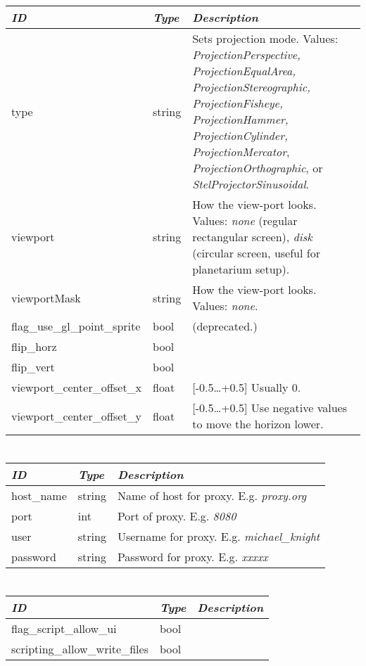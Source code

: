 \begin{longtabu} to \textwidth {l|l|X}
\toprule
\emph{ID} & \emph{Type} & \emph{Description}\tabularnewline
\midrule
type & string & Sets projection mode. Values: \emph{ProjectionPerspective,
ProjectionEqualArea, ProjectionStereographic, ProjectionFisheye,
ProjectionHammer, ProjectionCylinder, ProjectionMercator},
\emph{ProjectionOrthographic}, or \emph{StelProjectorSinusoidal}.\tabularnewline
\midrule
viewport & string & How the view-port looks. Values:
\emph{none} (regular rectangular screen), \emph{disk} (circular screen, useful for planetarium setup).\tabularnewline
\midrule
viewportMask & string & How the view-port looks. Values: \emph{none}.\tabularnewline
\midrule
flag\_use\_gl\_point\_sprite & bool & (deprecated.)\  \tabularnewline
\midrule
flip\_horz & bool & \tabularnewline
\midrule
flip\_vert & bool & \tabularnewline
\midrule
viewport\_center\_offset\_x & float & [-0.5\ldots+0.5] Usually 0. \\
\midrule
viewport\_center\_offset\_y & float & [-0.5\ldots+0.5] Use negative values to move the horizon lower. \\
\bottomrule
\end{longtabu}

\section{}\label{section-proxy}

\begin{longtabu} to \textwidth {l|l|X}
\toprule
\emph{ID} & \emph{Type} & \emph{Description}\tabularnewline
\midrule
host\_name & string & Name of host for proxy. E.g. \emph{proxy.org}\tabularnewline
\midrule
port & int & Port of proxy. E.g. \emph{8080}\tabularnewline
\midrule
user & string & Username for proxy. E.g. \emph{michael\_knight}\tabularnewline
\midrule
password & string & Password for proxy. E.g. \emph{xxxxx}\tabularnewline
\bottomrule
\end{longtabu}

\section{}\label{section-scripts}

\begin{longtabu} to \textwidth {l|l|X}
\toprule
\emph{ID} & \emph{Type} & \emph{Description}\tabularnewline
\midrule
flag\_script\_allow\_ui & bool &\tabularnewline
\midrule
scripting\_allow\_write\_files & bool &\tabularnewline
\bottomrule
\end{longtabu}

